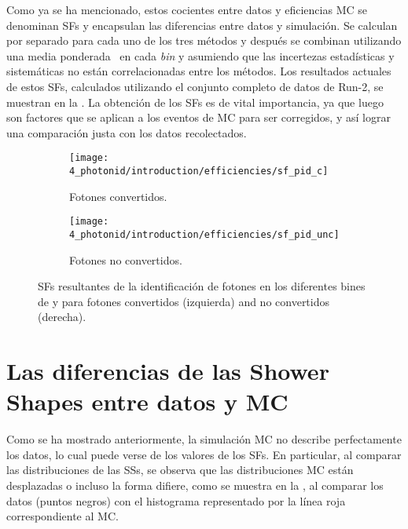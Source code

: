 Como ya se ha mencionado, estos cocientes entre datos y eficiencias \ac{MC} se denominan \acp{SF} y encapsulan las diferencias entre datos y simulación. Se calculan por separado para cada uno de los tres métodos y después se combinan utilizando una media ponderada~\cite{BLUEMethod} en cada \textit{bin} y asumiendo que las incertezas estadísticas y sistemáticas no están correlacionadas entre los métodos. Los resultados actuales de estos \acp{SF}, calculados utilizando el conjunto completo de datos de Run-2, se muestran en la \Fig{\ref{fig:pid_ss:pid:efficiencies:sfs}}. La obtenci\'on de los \acp{SF} es de vital importancia, ya que luego son factores que se aplican a los eventos de \ac{MC} para ser corregidos, y as\'i lograr una comparaci\'on justa con los datos recolectados.

\begin{figure}[ht!]
    \centering
    \begin{subfigure}[h]{0.49\linewidth}
        \centering
        \texttt{[image: 4\_photonid/introduction/efficiencies/sf\_pid\_c]}
        \caption{Fotones convertidos.}
    \end{subfigure}
    \hfill
    \begin{subfigure}[h]{0.49\linewidth}
        \centering
        \texttt{[image: 4\_photonid/introduction/efficiencies/sf\_pid\_unc]}
        \caption{Fotones no convertidos.}
    \end{subfigure}
    \caption{\acp{SF} resultantes de la identificaci\'on de fotones en los diferentes bines de \pt y \abseta para fotones convertidos (izquierda) and no convertidos (derecha).}
    \label{fig:pid_ss:pid:efficiencies:sfs}
\end{figure}


\section{Las diferencias de las Shower Shapes entre datos y MC}
\label{sec:pid_ss:ss_differences}


Como se ha mostrado anteriormente, la simulación \ac{MC} no describe perfectamente los datos, lo cual puede verse de los valores de los \acp{SF}. En particular, al comparar las distribuciones de las \acp{SS}, se observa que las distribuciones \ac{MC} están desplazadas o incluso la forma difiere, como se muestra en la \Fig{\ref{fig:pid_ss:ss_differences:ss}}, al comparar los datos (puntos negros) con el histograma representado por la línea roja correspondiente al \ac{MC}.

